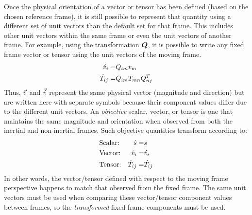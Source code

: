 Once the physical orientation of a vector or tensor has been defined
(based on the chosen reference frame), it is still possible to represent
that quantity using a different set of unit vectors than the default set
for that frame.
%
This includes other unit vectors within the same frame
or even the unit vectors of another frame.
%
For example, using the transformation ${\bm{{{{Q}}}}}$,
it is possible to write any fixed frame vector or tensor
using the unit vectors of the moving frame.
\begin{align}
    {{{{\acute{v}}}}}_{i}  =& {{{{Q}}}}_{im} {{{{v}}}}_{m} \\
    {{{{\acute{T}}}}}_{ij} =& {{{{Q}}}}_{im} {{{{T}}}}_{mn}
                   {{{{Q}}}}_{nj}^T
\end{align}
%
Thus, $\vec{{{{v}}}}$ and $\vec{{{{\acute{v}}}}}$ represent the same physical vector
(magnitude and direction) but are written here with separate symbols
because their component values differ due to the different unit vectors.
%
An {\em objective} scalar, vector, or tensor is one that maintains the
same magnitude and orientation when observed from both the inertial and
non-inertial frames.  Such objective quantities transform according to:
\begin{align}
 && %
    \label{EQN:ObjectiveScalar}
 &  \text{Scalar:} &
    \rot{s}     =& \fix{s}
 && %
    \\
 && %
    \label{EQN:ObjectiveVector}
 &  \text{Vector:} &
    \rvi{v}{i}  =& \mvi{v}{i}
 && %
    \\ %
 && %
    \label{EQN:ObjectiveTensor}
 &  \text{Tensor:} &
    \rti{T}{ij} =& \mti{T}{ij}
 && %
\end{align}
In other words, the vector/tensor defined with respect to the moving frame
perspective happens to match that observed from the fixed frame.
%
The same unit vectors must be used when comparing these vector/tensor component
values between frames, so the \emph{transformed} fixed frame components
must be used.


